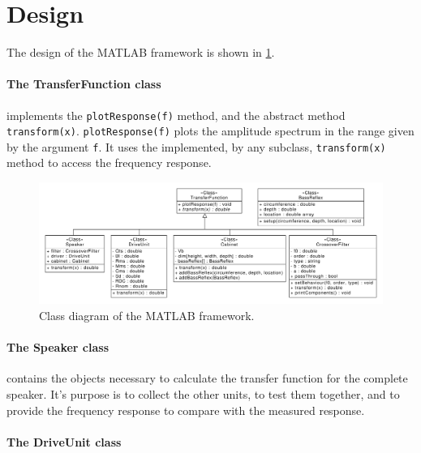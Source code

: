 \section{Design}
The design of the MATLAB framework is shown in \cref{fig:classbdd}.

\paragraph{The TransferFunction class} implements the \texttt{plotResponse(f)} method, and the  abstract method \texttt{transform(x)}.
\texttt{plotResponse(f)} plots the amplitude spectrum in the range given by the argument \texttt{f}.
It uses the implemented, by any subclass, \texttt{transform(x)} method to access the frequency response.

\begin{figure}
	\centering
	\includegraphics[width=\linewidth]{gfx/Design/Class_BDD}
	\caption{Class diagram of the MATLAB framework.}
	\label{fig:classbdd}
\end{figure}

\paragraph{The Speaker class} contains the objects necessary to calculate the transfer function for the complete speaker.
It's purpose is to collect the other units, to test them together, and to provide the frequency response to compare with the measured response.

\paragraph{The DriveUnit class}